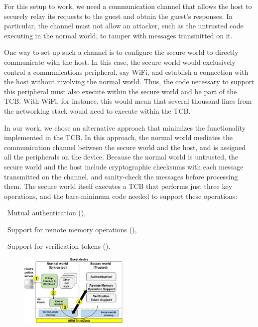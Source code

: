 For this setup to work, we need a communication channel that allows the host to
securely relay its requests to the guest and obtain the guest's responses. In
particular, the channel must not allow an attacker, such as the untrusted code
executing in the normal world, to tamper with messages transmitted on it.

One way to set up such a channel is to configure the secure world to directly
communicate with the host. In this case, the secure world would exclusively
control a communications peripheral, say WiFi, and establish a connection with
the host without involving the normal world. Thus, the code necessary to
support this peripheral must also execute within the secure world and be part
of the TCB. With WiFi, for instance, this would mean that several thousand
lines from the networking stack would need to execute within the TCB.

In our work, we chose an alternative approach that minimizes the functionality
implemented in the TCB. In this approach, the normal world mediates the
communication channel between the secure world and the host, and is assigned
all the peripherals on the device. Because the normal world is untrusted, the
secure world and the host include cryptographic checksums with each message
transmitted on the channel, and sanity-check the messages before processing
them. The secure world itself executes a TCB that performs just three key
operations, and the bare-minimum code needed to support these operations:
%
\begin{mylist}
%
\item~Mutual authentication (), 
%
\item~Support for remote memory operations (),
%
\item~Support for verification tokens (). 
%
\end{mylist}

\begin{figure}[t!]
\centering
\includegraphics[keepaspectratio=true,width=0.47\textwidth]{figures/overall-design.png}
\end{figure}

